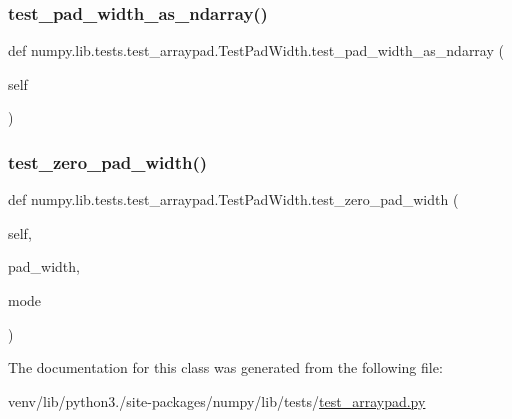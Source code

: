 \subsubsection{\texorpdfstring{test\+\_\+pad\+\_\+width\+\_\+as\+\_\+ndarray()}{test\_pad\_width\_as\_ndarray()}}
{\footnotesize\ttfamily def numpy.\+lib.\+tests.\+test\+\_\+arraypad.\+Test\+Pad\+Width.\+test\+\_\+pad\+\_\+width\+\_\+as\+\_\+ndarray (\begin{DoxyParamCaption}\item[{}]{self }\end{DoxyParamCaption})}

\mbox{\label{classnumpy_1_1lib_1_1tests_1_1test__arraypad_1_1TestPadWidth_a4300d5bf7e6b05893b54c10ad5482b5a}} 
\subsubsection{\texorpdfstring{test\+\_\+zero\+\_\+pad\+\_\+width()}{test\_zero\_pad\_width()}}
{\footnotesize\ttfamily def numpy.\+lib.\+tests.\+test\+\_\+arraypad.\+Test\+Pad\+Width.\+test\+\_\+zero\+\_\+pad\+\_\+width (\begin{DoxyParamCaption}\item[{}]{self,  }\item[{}]{pad\+\_\+width,  }\item[{}]{mode }\end{DoxyParamCaption})}



The documentation for this class was generated from the following file\+:\begin{DoxyCompactItemize}
\item 
venv/lib/python3./site-\/packages/numpy/lib/tests/\hyperlink{test__arraypad_8py}{test\+\_\+arraypad.\+py}\end{DoxyCompactItemize}
